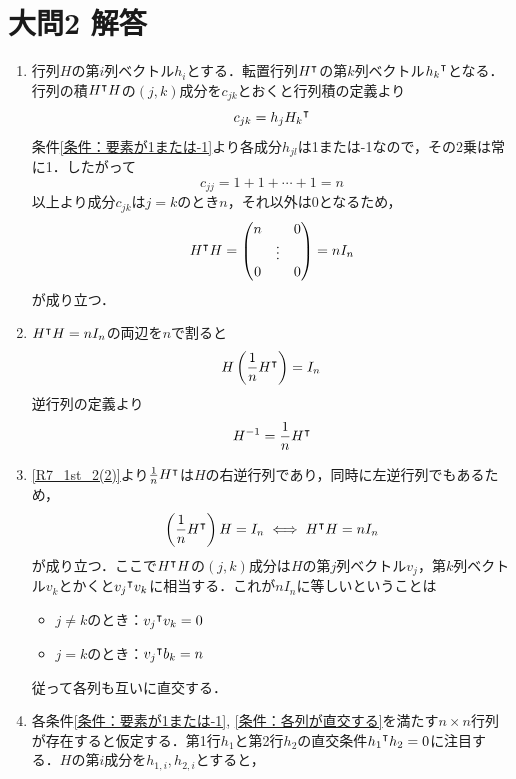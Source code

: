 \documentclass[dvipdfmx]{jsreport}
\begin{document}
\section{大問2 解答}
\begin{souanswer} %
\begin{enumerate}
	\item\label{R7_1st_2(2)} 行列$H$の第$i$列ベクトル$h_i$とする．転置行列${H}^\intercal$の第$k$列ベクトル${h_k}^\intercal$となる．行列の積${H}^\intercal H$の$(j, k)$成分を$c_{jk}$とおくと行列積の定義より
\begin{equation*}
	c_{jk}= h_j{H_k}^\intercal
\end{equation*}
	条件\ref{条件：要素が1または-1}より各成分$h_{jl}$は1または-1なので，その2乗は常に1．したがって
\begin{equation*}
	c_{jj}= 1+ 1+ \cdots+ 1= n
\end{equation*}
	以上より成分$c_{jk}$は$j= k$のとき$n$，それ以外は0となるため，
\begin{equation*}
	{H}^\intercal H= 
\begin{pmatrix}
	n& & 0\\
	& \vdots& \\
	0& & 0
\end{pmatrix}= 
	nI_n
\end{equation*}
	が成り立つ．
	\item ${H}^\intercal H= nI_n$の両辺を$n$で割ると
\begin{equation*}
	H\left(\frac{1}{n}{H}^\intercal\right)= I_n
\end{equation*}
	逆行列の定義より
\begin{equation*}
	H^{-1}= \frac{1}{n}{H}^\intercal
\end{equation*}
	\item \ref{R7_1st_2(2)}より$\frac{1}{n}{H}^\intercal$は$H$の右逆行列であり，同時に左逆行列でもあるため，
\begin{equation*}
	\left(\frac{1}{n}{H}^\intercal\right)H= I_n\iff {H}^\intercal H= nI_n
\end{equation*}
	が成り立つ．ここで${H}^\intercal H$の$(j, k)$成分は$H$の第$j$列ベクトル$v_j$，第$k$列ベクトル$v_k$とかくと${v_j}^\intercal v_k$に相当する．これが$nI_n$に等しいということは
\begin{itemize}
	\item[] $j\ne k$のとき：${v_j}^\intercal v_k= 0$
	\item[] $j= k$のとき：${v_j}^\intercal b_k= n$ 
\end{itemize}
	従って各列も互いに直交する．
	\item 各条件\ref{条件：要素が1または-1}, \ref{条件：各列が直交する}を満たす$n\times n$行列が存在すると仮定する．第1行$h_1$と第2行$h_2$の直交条件${h_1}^\intercal h_2= 0$に注目する．$H$の第$i$成分を$h_{1, i}, h_{2, i}$とすると，

\end{enumerate}
\end{souanswer}
\end{document}
